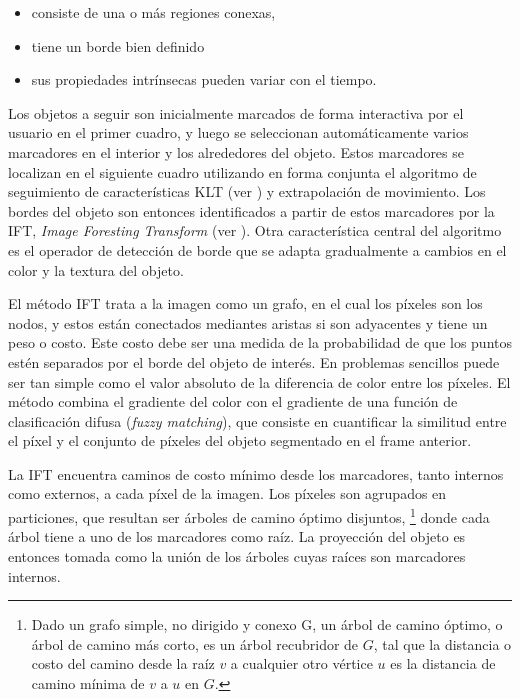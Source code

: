 \documentclass[a4paper,10pt]{article}
\begin{document}
\begin{itemize}
    \item consiste de una o más regiones conexas,
    \item tiene un borde bien definido
    \item sus propiedades intrínsecas pueden variar con el tiempo.
\end{itemize}

Los objetos a seguir son inicialmente marcados de forma interactiva por el
usuario en el primer cuadro, y luego se seleccionan automáticamente varios
marcadores en el interior y los alrededores del objeto. Estos marcadores se
localizan en el siguiente cuadro utilizando en forma conjunta el algoritmo de
seguimiento de características KLT (ver \cite{KLT}) y extrapolación de
movimiento. Los bordes del objeto son entonces identificados a partir de estos
marcadores por la IFT, \textit{Image Foresting Transform} (ver \cite{IFT}).
Otra característica central del algoritmo es el operador de detección de borde
que se adapta gradualmente a cambios en el color y la textura del objeto.

El método IFT trata a la imagen como un grafo, en el cual los píxeles son los
nodos, y estos están conectados mediantes aristas si son adyacentes y tiene un
peso o costo. Este costo debe ser una medida de la probabilidad de que los
puntos estén separados por el borde del objeto de interés. En problemas
sencillos puede ser tan simple como el valor absoluto de la diferencia de color
entre los píxeles. El método combina el gradiente del color con el gradiente de
una función de clasificación difusa (\textit{fuzzy matching}), que consiste en
cuantificar la similitud entre el píxel y el conjunto de píxeles del objeto
segmentado en el frame anterior.

La IFT encuentra caminos de costo mínimo desde los marcadores, tanto internos
como externos, a cada píxel de la imagen. Los píxeles son agrupados en
particiones, que resultan ser árboles de camino óptimo disjuntos,
\footnote{Dado un grafo simple, no dirigido y conexo G, un árbol de camino
  óptimo, o árbol de camino más corto, es un árbol recubridor de $G$, tal que
  la distancia o costo del camino desde la raíz $v$ a cualquier otro vértice
$u$ es la distancia de camino mínima de $v$ a $u$ en $G$.} donde cada árbol
tiene a uno de los marcadores como raíz. La proyección del objeto es entonces
tomada como la unión de los árboles cuyas raíces son marcadores internos.
\end{document}
